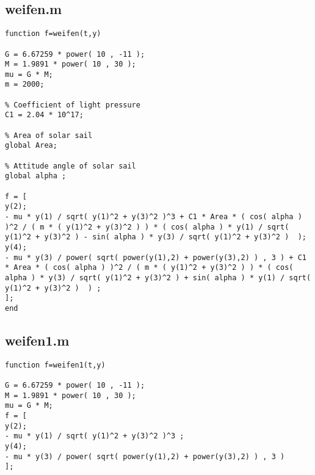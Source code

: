 \documentclass[../Paper.tex]{subfiles}
\begin{document}
\subsection{weifen.m}
\begin{verbatim}
function f=weifen(t,y)

G = 6.67259 * power( 10 , -11 );
M = 1.9891 * power( 10 , 30 );
mu = G * M;
m = 2000; 

% Coefficient of light pressure 
C1 = 2.04 * 10^17;

% Area of solar sail
global Area;

% Attitude angle of solar sail 
global alpha ;

f = [
y(2);
- mu * y(1) / sqrt( y(1)^2 + y(3)^2 )^3 + C1 * Area * ( cos( alpha ) )^2 / ( m * ( y(1)^2 + y(3)^2 ) ) * ( cos( alpha ) * y(1) / sqrt( y(1)^2 + y(3)^2 ) - sin( alpha ) * y(3) / sqrt( y(1)^2 + y(3)^2 )  );                                                                              
y(4);
- mu * y(3) / power( sqrt( power(y(1),2) + power(y(3),2) ) , 3 ) + C1 * Area * ( cos( alpha ) )^2 / ( m * ( y(1)^2 + y(3)^2 ) ) * ( cos( alpha ) * y(3) / sqrt( y(1)^2 + y(3)^2 ) + sin( alpha ) * y(1) / sqrt( y(1)^2 + y(3)^2 )  ) ;
];
end
\end{verbatim}

\subsection{weifen1.m}
\begin{verbatim}
function f=weifen1(t,y)

G = 6.67259 * power( 10 , -11 );
M = 1.9891 * power( 10 , 30 );
mu = G * M;
f = [
y(2);
- mu * y(1) / sqrt( y(1)^2 + y(3)^2 )^3 ;
y(4);
- mu * y(3) / power( sqrt( power(y(1),2) + power(y(3),2) ) , 3 )
];
\end{verbatim}
\end{document}
